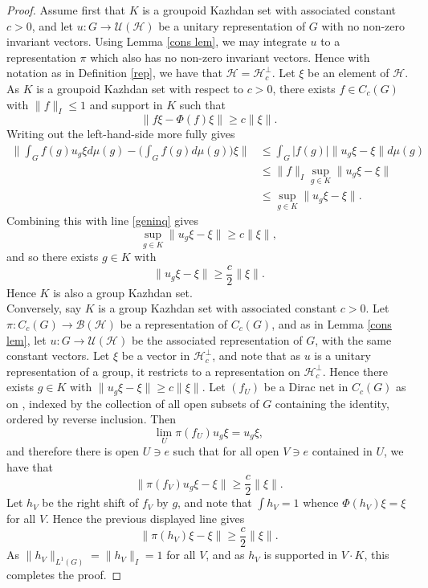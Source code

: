 \documentclass{article}
\newcommand{\h}{\mathcal{H}}
\theoremstyle{plain}
\theoremstyle{definition}
\theoremstyle{remark}
\begin{document}
\begin{proof}
Assume first that $K$ is a groupoid Kazhdan set with associated constant $c>0$, and let $u:G\to \mathcal{U}(\h)$ be a unitary representation of $G$ with no non-zero invariant vectors.  Using Lemma \ref{cons lem}, we may integrate $u$ to a representation $\pi$ which also has no non-zero invariant vectors.  Hence with notation as in Definition \ref{rep}, we have that $\h=\h_c^\perp$.  Let $\xi$ be an element of $\h$.  As $K$ is a groupoid Kazhdan set with respect to $c>0$, there exists $f\in C_c(G)$ with $\|f\|_I\leq 1$ and support in $K$ such that
\begin{equation}\label{geninq}
\|f\xi-\Phi(f)\xi\|\geq c\|\xi\|.
\end{equation}
Writing out the left-hand-side more fully gives
\begin{align*}
\Big\|\int_G f(g)u_g\xi d\mu(g)-\Big(\int_G f(g)d\mu(g)\Big)\xi\Big\| & \leq \int_G |f(g)|\|u_g\xi-\xi\|d\mu(g) \\ & \leq \|f\|_I\sup_{g\in K}\|u_g\xi-\xi\| \\ & \leq \sup_{g\in K}\|u_g\xi-\xi\|.
\end{align*}
Combining this with line \eqref{geninq} gives
$$
\sup_{g\in K}\|u_g\xi-\xi\|\geq c\|\xi\|,
$$
and so there exists $g\in K$ with 
$$
\|u_g\xi-\xi\|\geq \frac{c}{2}\|\xi\|.
$$
Hence $K$ is also a group Kazhdan set.\\

Conversely, say $K$ is a group Kazhdan set with associated constant $c>0$.  Let $\pi:C_c(G)\to \mathcal{B}(\h)$ be a representation of $C_c(G)$, and as in Lemma \ref{cons lem}, let $u:G\to \mathcal{U}(\h)$ be the associated representation of $G$, with the same constant vectors.  Let $\xi$ be a vector in $\h_c^\perp$, and note that as $u$ is a unitary representation of a group, it restricts to a representation on $\h_c^\perp$.  Hence there exists $g\in K$ with $\|u_g\xi-\xi\|\geq c\|\xi\|$.  Let $(f_U)$ be a Dirac net in $C_c(G)$ as on \cite[page 22]{Echterhoff:2009qd}, indexed by the collection of all open subsets of $G$ containing the identity, ordered by reverse inclusion.  Then 
$$
\lim_U \pi(f_U)u_g\xi=u_g\xi,
$$
and therefore there is open $U\owns e$ such that for all open $V\owns e$ contained in $U$, we have that 
$$
\|\pi(f_V)u_g\xi-\xi\|\geq \frac{c}{2}\|\xi\|.
$$ 
Let $h_V$ be the right shift of $f_V$ by $g$, and note that $\int h_V=1$ whence $\Phi(h_V)\xi=\xi$ for all $V$.  Hence the previous displayed line gives
$$
\|\pi(h_V)\xi-\xi\|\geq \frac{c}{2}\|\xi\|.
$$
As $\|h_V\|_{L^1(G)}=\|h_V\|_I=1$ for all $V$, and as $h_V$ is supported in $V\cdot K$, this completes the proof.
\end{proof}
\end{document}
